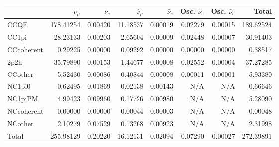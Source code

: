 \begin{tabular} { | l ||r | r | r | r | r | r | | r | }
\hline
              & $\nu_\mu$            & $\nu_e$              & $\bar{\nu}_{\mu}$    & $\bar{\nu}_{e}$      & Osc. $\nu_e$         & Osc. $\bar{\nu}_{e}$ & Total                \\ \hline\hline
 CCQE         & 178.41254            & 0.00420              & 11.18537             & 0.00019              & 0.02279              & 0.00015              & 189.62524            \\ \hline
 CC1pi        & 28.23133             & 0.00203              & 2.65604              & 0.00009              & 0.02448              & 0.00007              & 30.91403             \\ \hline
 CCcoherent   & 0.29225              & 0.00000              & 0.09292              & 0.00000              & 0.00000              & 0.00000              & 0.38517              \\ \hline
 2p2h         & 35.79890             & 0.00153              & 1.44677              & 0.00008              & 0.02552              & 0.00004              & 37.27285             \\ \hline
 CCother      & 5.52430              & 0.00086              & 0.40844              & 0.00008              & 0.00011              & 0.00001              & 5.93380              \\ \hline
 NC1pi0       & 0.62495              & 0.01869              & 0.02138              & 0.00143              & N/A                  & N/A                  & 0.66646              \\ \hline
 NC1piPM      & 4.99423              & 0.09960              & 0.17726              & 0.00980              & N/A                  & N/A                  & 5.28090              \\ \hline
 NCcoherent   & 0.00000              & 0.00000              & 0.00044              & 0.00003              & N/A                  & N/A                  & 0.00048              \\ \hline
 NCother      & 2.10279              & 0.07529              & 0.13268              & 0.00923              & N/A                  & N/A                  & 2.31998              \\ \hline
\hline
 Total        & 255.98129            & 0.20220              & 16.12131             & 0.02094              & 0.07290              & 0.00027              & 272.39891            \\ \hline

\end{tabular}
